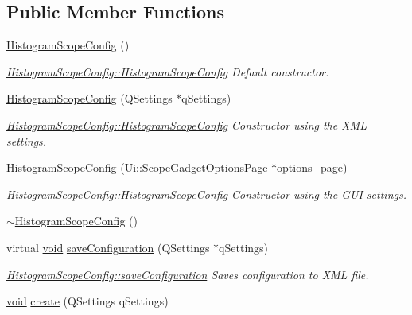 \subsection*{Public Member Functions}
\begin{DoxyCompactItemize}
\item 
\hyperlink{group___scope_plugin_ga3770fc706fe9b5fdd16bad59dfc23fa1}{Histogram\-Scope\-Config} ()
\begin{DoxyCompactList}\small\item\em \hyperlink{group___scope_plugin_ga3770fc706fe9b5fdd16bad59dfc23fa1}{Histogram\-Scope\-Config\-::\-Histogram\-Scope\-Config} Default constructor. \end{DoxyCompactList}\item 
\hyperlink{group___scope_plugin_ga0a412b8c840e9f5bc746d492cafed2a5}{Histogram\-Scope\-Config} (Q\-Settings $\ast$q\-Settings)
\begin{DoxyCompactList}\small\item\em \hyperlink{group___scope_plugin_ga3770fc706fe9b5fdd16bad59dfc23fa1}{Histogram\-Scope\-Config\-::\-Histogram\-Scope\-Config} Constructor using the X\-M\-L settings. \end{DoxyCompactList}\item 
\hyperlink{group___scope_plugin_gaa8c3ad4f914751d27033f2c70ea2fc2c}{Histogram\-Scope\-Config} (Ui\-::\-Scope\-Gadget\-Options\-Page $\ast$options\-\_\-page)
\begin{DoxyCompactList}\small\item\em \hyperlink{group___scope_plugin_ga3770fc706fe9b5fdd16bad59dfc23fa1}{Histogram\-Scope\-Config\-::\-Histogram\-Scope\-Config} Constructor using the G\-U\-I settings. \end{DoxyCompactList}\item 
\hyperlink{group___scope_plugin_gafbd12c48895f5b324a0048f956c2a773}{$\sim$\-Histogram\-Scope\-Config} ()
\item 
virtual \hyperlink{group___u_a_v_objects_plugin_ga444cf2ff3f0ecbe028adce838d373f5c}{void} \hyperlink{group___scope_plugin_ga08dd5f7ac27b067ed6eddc9e645bce45}{save\-Configuration} (Q\-Settings $\ast$q\-Settings)
\begin{DoxyCompactList}\small\item\em \hyperlink{group___scope_plugin_ga08dd5f7ac27b067ed6eddc9e645bce45}{Histogram\-Scope\-Config\-::save\-Configuration} Saves configuration to X\-M\-L file. \end{DoxyCompactList}\item 
\hyperlink{group___u_a_v_objects_plugin_ga444cf2ff3f0ecbe028adce838d373f5c}{void} \hyperlink{group___scope_plugin_ga23b4c258bf17b6bc16c3dc75ea7d98eb}{create} (Q\-Settings q\-Settings)

\end{DoxyCompactItemize}
